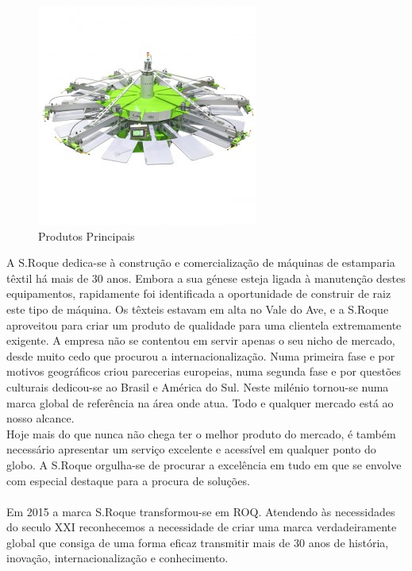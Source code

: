 {\begin{figure}[ht]
\begin{center}
\includegraphics[scale=0.5]{"./image/ROQ/maquinas/You-600x600-275x275"}
\end{center}
\caption{Produtos Principais}
\end{figure}\par





\newpage
A S.Roque dedica-se à construção e comercialização de máquinas de estamparia têxtil há mais de 30 anos. Embora a sua génese esteja ligada à manutenção destes equipamentos, rapidamente foi identificada a oportunidade de construir de raiz este tipo de máquina. Os têxteis estavam em alta no Vale do Ave, e a S.Roque aproveitou para criar um produto de qualidade para uma clientela extremamente exigente. A empresa não se contentou em servir apenas o seu nicho de mercado, desde muito cedo que procurou a internacionalização. Numa primeira fase e por motivos geográficos criou parecerias europeias, numa segunda fase e por questões culturais dedicou-se ao Brasil e América do Sul. Neste milénio tornou-se numa marca global de referência na área onde atua. Todo e qualquer mercado está ao nosso alcance.\\
Hoje mais do que nunca não chega ter o melhor produto do mercado, é também necessário apresentar um serviço excelente e acessível em qualquer ponto do globo. A S.Roque orgulha-se de procurar a excelência em tudo em que se envolve com especial destaque para a procura de soluções.\\
\\
Em 2015 a marca S.Roque transformou-se em ROQ. Atendendo às necessidades do seculo XXI reconhecemos a necessidade de criar uma marca verdadeiramente global que consiga de uma forma eficaz transmitir mais de 30 anos de história, inovação, internacionalização e conhecimento.




}
